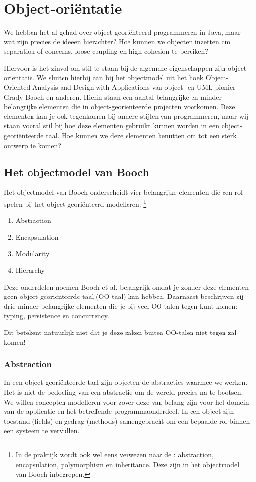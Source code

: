 \chapter{Object-oriëntatie}
We hebben het al gehad over object-georiënteerd programmeren
in Java, maar wat zijn precies de ideeën hierachter?
Hoe kunnen we objecten inzetten om separation of concerns,
loose coupling en high cohesion te bereiken?

Hiervoor is het zinvol om stil te staan bij de algemene eigenschappen 
zijn object-oriëntatie. We sluiten hierbij aan 
bij het objectmodel uit het boek 
Object-Oriented Analysis and Design with Applications 
van object- en UML-pionier Grady Booch en anderen. 
Hierin staan een aantal belangrijke en minder belangrijke 
elementen die in object-georiënteerde projecten voorkomen. 
Deze elementen kan je ook tegenkomen bij andere stijlen van programmeren,
maar wij staan vooral stil bij hoe deze elementen gebruikt kunnen worden 
in een object-georiënteerde taal. Hoe kunnen we deze elementen benutten 
om tot een sterk ontwerp te komen?

\section{Het objectmodel van Booch}
Het objectmodel van Booch onderscheidt vier belangrijke elementen 
die een rol spelen bij het object-georiënteerd modelleren:
\footnote{
    In de praktijk wordt ook wel eens verwezen naar de : 
    abstraction, encapsulation, polymorphism en inheritance. 
    Deze zijn in het objectmodel van Booch inbegrepen.
}
\begin{enumerate}
    \item Abstraction
    \item Encapsulation 
    \item Modularity 
    \item Hierarchy
\end{enumerate}

Deze onderdelen noemen Booch et al. belangrijk omdat je 
zonder deze elementen geen object-georiënteerde taal (OO-taal) kan hebben.
Daarnaast beschrijven zij drie minder belangrijke elementen die je 
bij veel OO-talen tegen kunt komen: typing, persistence en concurrency.

Dit betekent natuurlijk niet dat je deze zaken buiten OO-talen niet tegen zal komen! 

\subsection{Abstraction}
In een object-georiënteerde taal zijn objecten de abstracties 
waarmee we werken. Het is niet de bedoeling van een abstractie 
om de wereld precies na te bootsen.
We willen concepten modelleren voor zover deze van belang zijn 
voor het domein van de applicatie en het betreffende programmaonderdeel.
In een object zijn toestand (fields) en gedrag (methods) samengebracht
om een bepaalde rol binnen een systeem te vervullen.

